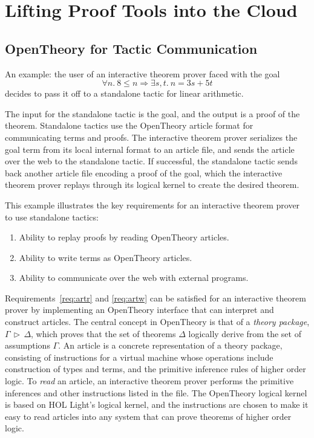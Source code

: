 \documentclass{llncs}
\newcommand{\OpenTheory}{OpenTheory\xspace}
\newcommand{\theory}[2]{{#1}\,\triangleright\,{#2}}
\begin{document}
\section{Lifting Proof Tools into the Cloud}
\label{sec:implementation}

\subsection{\OpenTheory for Tactic Communication}

An example: the user of an interactive theorem prover faced with the goal
\[
\forall n.\ 8\le n\Rightarrow\exists s,t.\ n = 3s + 5t
\]
decides to pass it off to a standalone tactic for linear arithmetic.

The input for the standalone tactic is the goal, and the output is a proof of the theorem.
Standalone tactics use the \OpenTheory article format for communicating terms and proofs.
The interactive theorem prover serializes the goal term from its local internal format to an article file, and sends the article over the web to the standalone tactic.
If successful, the standalone tactic sends back another article file encoding a proof of the goal, which the interactive theorem prover replays through its logical kernel to create the desired theorem.

This example illustrates the key requirements for an interactive theorem prover to use standalone tactics:
\begin{enumerate}
\item\label{req:artr} Ability to replay proofs by reading \OpenTheory articles.

\item\label{req:artw} Ability to write terms as \OpenTheory articles.

\item\label{req:comm} Ability to communicate over the web with external programs.
\end{enumerate}

Requirements~\ref{req:artr} and \ref{req:artw} can be satisfied for an interactive theorem prover by implementing an \OpenTheory interface that can interpret and construct articles.
The central concept in \OpenTheory is that of a \emph{theory package}, $\theory{\Gamma}{\Delta}$, which proves that the set of theorems $\Delta$ logically derive from the set of assumptions $\Gamma$.
An article is a concrete representation of a theory package, consisting of instructions for a virtual machine whose operations include construction of types and terms, and the primitive inference rules of higher order logic.
To \emph{read} an article, an interactive theorem prover performs the primitive inferences and other instructions listed in the file.
The \OpenTheory logical kernel is based on HOL Light's logical kernel, and the instructions are chosen to make it easy to read articles into any system that can prove theorems of higher order logic.
\end{document}
